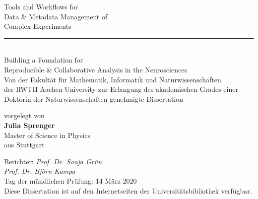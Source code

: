 \documentclass[
    pdftex,
    fontsize=11pt,
    a4paper
   ]{scrbook}
\renewcommand{\title}{\LARGE Tools and Workflows for\\\LARGE Data \& Metadata Management of\\\LARGE Complex Experiments}
\renewcommand{\subtitle}{Building a Foundation for \\Reproducible \& Collaborative Analysis in the Neurosciences}
\newcommand{\thesisdate}{14 März 2020}
\newcommand{\thesisauthor}{Julia Sprenger}
\newcommand{\authorbirthplace}{Stuttgart}
\newcommand{\authordegree}{Master of Science in Physics}
\begin{document}
\begin{titlepage}
    \begin{center}
        \Large
        \title\\
        \vspace{1cm}
        \textcolor{black!50}{\rule{3cm}{0.4pt}}\\
        \vspace{1cm}
        \Large\subtitle\\
        \vspace{3cm}
        \large
        Von der Fakultät für Mathematik, Informatik und Naturwissenschaften\\
        der RWTH Aachen University zur Erlangung des akademischen Grades einer
        Doktorin der Naturwissenschaften genehmigte Dissertation
        
        \vspace{1.5cm}
        vorgelegt von\\
        \large{\textbf{\thesisauthor{}}}\\
        \normalsize
        \authordegree\\
        \vspace{0.5cm}
        aus \authorbirthplace\\
        \vspace{1cm}
        \large
    \end{center}
    Berichter: \textit{Prof. Dr. Sonja Grün}\\
    \hphantom{Berichter: }\textit{Prof. Dr. Björn Kampa}\\
    
    \noindent
    Tag der mündlichen Prüfung: \thesisdate\\
    
    \noindent
    Diese Dissertation ist auf den Internetseiten der Universitätsbibliothek verfügbar.
\end{titlepage}
\end{document}
